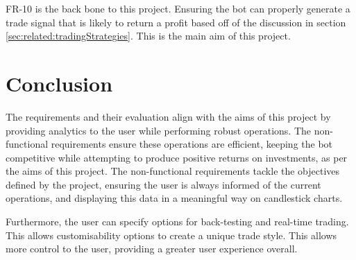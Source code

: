 FR-10 is the back bone to this project. Ensuring the bot can properly generate a trade signal that is likely to return a profit based off of the discussion in section \ref{sec:related:tradingStrategies}. This is the main aim of this project.


\section{Conclusion}
\label{sec:requirements:conclusion}
\noindent The requirements and their evaluation align with the aims of this project by providing analytics to the user while performing robust operations. The non-functional requirements ensure these operations are efficient, keeping the bot competitive while attempting to produce positive returns on investments, as per the aims of this project. The non-functional requirements tackle the objectives defined by the project, ensuring the user is always informed of the current operations, and displaying this data in a meaningful way on candlestick charts. 

Furthermore, the user can specify options for back-testing and real-time trading. This allows customisability options to create a unique trade style. This allows more control to the user, providing a greater user experience overall.

